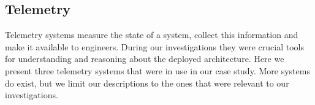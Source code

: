 
%

\subsection{Telemetry}
\label{subsec:telemetry}

Telemetry systems measure the state of a system, collect this information and make it available to engineers. During our investigations they were crucial tools for understanding and reasoning about the deployed architecture. Here we present three telemetry systems that were in use in our case study. More systems do exist, but we limit our descriptions to the ones that were relevant to our investigations.

